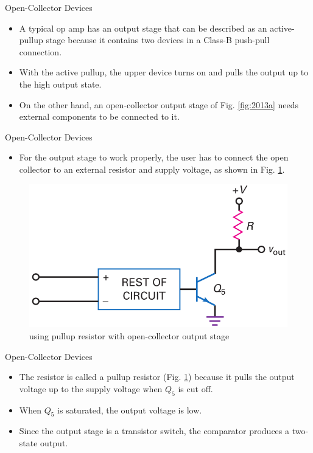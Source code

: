 \documentclass[pdflatex,compress]{beamer}
\begin{document}
\begin{frame}{Open-Collector Devices}
	\begin{itemize}
		\item A typical op amp has an output stage that can be described as an active-pullup stage because it contains two devices in a Class-B push-pull connection.
		\item With the active pullup, the upper device turns on and pulls the output up to the high output state.
		\item On the other hand, an open-collector output stage of Fig. \ref{fig:2013a} needs external components to be connected to it.
	\end{itemize}
\end{frame}

\begin{frame}{Open-Collector Devices}
	\begin{multicols}{2}
		\begin{itemize}
			\item For the output stage to work properly, the user has to connect the open collector to an external resistor and supply voltage, as shown in Fig. \ref{fig:2013b}.
		\end{itemize}
		\vfill \null
		\columnbreak
		\begin{figure}
			\centering
			\includegraphics[width=\linewidth]{img/2013b}
			\caption{using pullup resistor with open-collector output stage}
			\label{fig:2013b}
		\end{figure}
	\end{multicols}
\end{frame}

\begin{frame}{Open-Collector Devices}
	\begin{itemize}
		\item The resistor is called a pullup resistor (Fig. \ref{fig:2013b}) because it pulls the output voltage up to the
		supply voltage when $Q_5$ is cut off.
		\item When $Q_5$ is saturated, the output voltage is low.
		\item Since the output stage is a transistor switch, the comparator produces a two-state output.
	\end{itemize}
\end{frame}
\end{document}
